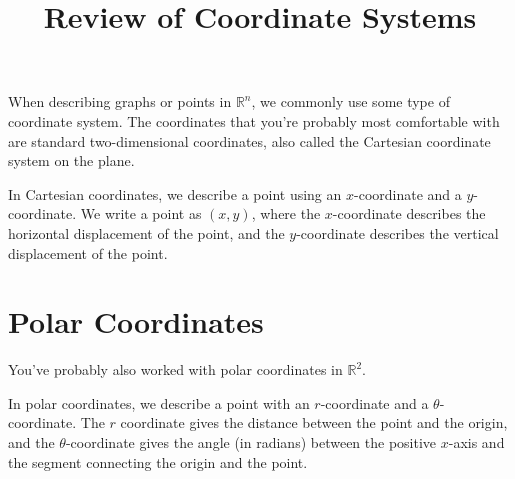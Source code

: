 \documentclass{ximera}
\title{Review of Coordinate Systems}
\begin{document}
\begin{abstract}
\end{abstract}
\maketitle

When describing graphs or points in $\mathbb{R}^n$, we commonly use some type of coordinate system. The coordinates that you're probably most comfortable with are standard two-dimensional coordinates, also called the Cartesian coordinate system on the plane.

In Cartesian coordinates, we describe a point using an $x$-coordinate and a $y$-coordinate. We write a point as $(x,y)$, where the $x$-coordinate describes the horizontal displacement of the point, and the $y$-coordinate describes the vertical displacement of the point.

\begin{image}
\end{image}

\section*{Polar Coordinates}

You've probably also worked with polar coordinates in $\mathbb{R}^2$.

In polar coordinates, we describe a point with an $r$-coordinate and a $\theta$-coordinate. The $r$ coordinate gives the distance between the point and the origin, and the $\theta$-coordinate gives the angle (in radians) between the positive $x$-axis and the segment connecting the origin and the point.
\end{document}
